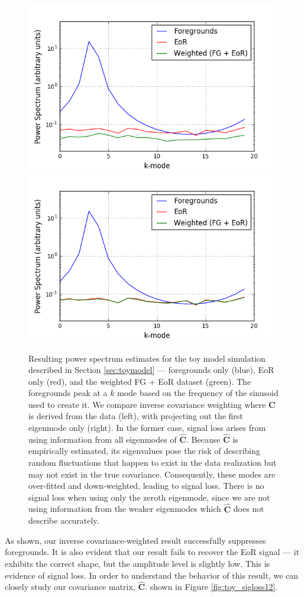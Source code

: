 \documentclass[preprint2,numberedappendix,tighten]{aastex6}  %
\begin{document}
\begin{figure}
	\centering
	\includegraphics[trim={0.3cm 0.2cm 1cm 0.3cm},clip,height=0.3\textwidth]{plots/toy_sigloss3.png}
	\includegraphics[trim={1cm 0.2cm 0cm 0.3cm},clip,height=0.3\textwidth]{plots/toy_sigloss4.png}
	\caption{Resulting power spectrum estimates for the toy model simulation described in Section \ref{sec:toymodel} --- 
foregrounds only (blue), EoR only (red), and the weighted FG + EoR dataset (green). The foregrounds peak at a $k$ mode based on the frequency of the sinusoid used to create it. We compare inverse covariance weighting 
where $\textbf{C}$ is derived from the data (left), with projecting out the first eigenmode only (right). In the former 
case, signal loss arises from using information from all eigenmodes of $\hat{\textbf{C}}$. Because $\hat{\textbf{C}}$ is 
empirically estimated, its eigenvalues pose the risk of describing random fluctuations that happen to exist in the data realization 
but may not exist in the true covariance. Consequently, these modes are over-fitted and down-weighted, leading to signal loss. 
There is no signal loss when using only the zeroth eigenmode, since we are not using information from the weaker eigenmodes 
which $\hat{\textbf{C}}$ does not describe accurately.}
	\label{fig:toy_sigloss3}
\end{figure}

As shown, our inverse covariance-weighted result successfully suppresses foregrounds. It is also evident that our result fails to 
recover the EoR signal --- it exhibits the correct shape, but the amplitude level is slightly low. This is evidence of signal loss. In 
order to understand the behavior of this result, we can closely study our covariance matrix, $\hat{\textbf{C}}$. %
shown in Figure \ref{fig:toy_sigloss12}.
\end{document}
